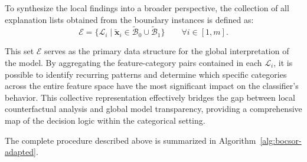 To synthesize the local findings into a broader perspective, the collection of all explanation lists obtained from the boundary instances is defined as:
\begin{equation}
  \mathcal{E} = \{ \mathcal{L}_i \mid \tilde{\mathbf{x}}_i \in \widetilde{\mathcal{B}}_0 \cup \widetilde{\mathcal{B}}_1 \} \qquad \forall i \in [1, m].
\end{equation}

This set $\mathcal{E}$ serves as the primary data structure for the global interpretation of the model. By aggregating the feature-category pairs contained in each $\mathcal{L}_i$, it is possible to identify recurring patterns and determine which specific categories across the entire feature space have the most significant impact on the classifier's behavior. This collective representation effectively bridges the gap between local counterfactual analysis and global model transparency, providing a comprehensive map of the decision logic within the categorical setting.

The complete procedure described above is summarized in Algorithm~\ref{alg:bocsor-adapted}.

